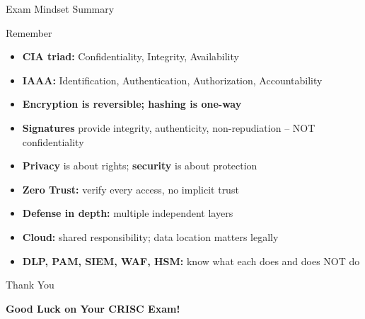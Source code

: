 \documentclass{beamer}
\begin{document}
	\begin{frame}{Exam Mindset Summary}
		\begin{block}{Remember}
			\begin{itemize}
				\item \textbf{CIA triad:} Confidentiality, Integrity, Availability
				\item \textbf{IAAA:} Identification, Authentication, Authorization, Accountability
				\item \textbf{Encryption is reversible; hashing is one-way}
				\item \textbf{Signatures} provide integrity, authenticity, non-repudiation -- NOT confidentiality
				\item \textbf{Privacy} is about rights; \textbf{security} is about protection
				\item \textbf{Zero Trust:} verify every access, no implicit trust
				\item \textbf{Defense in depth:} multiple independent layers
				\item \textbf{Cloud:} shared responsibility; data location matters legally
				\item \textbf{DLP, PAM, SIEM, WAF, HSM:} know what each does and does NOT do
			\end{itemize}
		\end{block}
	\end{frame}
	
	\begin{frame}{Thank You}
		\begin{center}
			{\Huge \textbf{Good Luck on Your CRISC Exam!}}
		\end{center}
	\end{frame}
	
\end{document}
